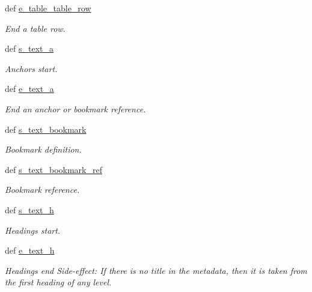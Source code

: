 \begin{DoxyCompactItemize}
def \hyperlink{classodf_1_1odf2xhtml_1_1ODF2XHTML_a2c0009aefeaa32a4aebf651241ec6457}{e\+\_\+table\+\_\+table\+\_\+row}
\begin{DoxyCompactList}\small\item\em End a table row. \end{DoxyCompactList}\item 
def \hyperlink{classodf_1_1odf2xhtml_1_1ODF2XHTML_a49f1c77f30fb4f13ba9fbd834c68c5fb}{s\+\_\+text\+\_\+a}
\begin{DoxyCompactList}\small\item\em Anchors start. \end{DoxyCompactList}\item 
def \hyperlink{classodf_1_1odf2xhtml_1_1ODF2XHTML_a14a820640a82139efd06c6f5380bb53b}{e\+\_\+text\+\_\+a}
\begin{DoxyCompactList}\small\item\em End an anchor or bookmark reference. \end{DoxyCompactList}\item 
def \hyperlink{classodf_1_1odf2xhtml_1_1ODF2XHTML_a81094645caa9e4af42180c1cbff16295}{s\+\_\+text\+\_\+bookmark}
\begin{DoxyCompactList}\small\item\em Bookmark definition. \end{DoxyCompactList}\item 
def \hyperlink{classodf_1_1odf2xhtml_1_1ODF2XHTML_a9d3a13f16064ec5f8ed95b7a5391a990}{s\+\_\+text\+\_\+bookmark\+\_\+ref}
\begin{DoxyCompactList}\small\item\em Bookmark reference. \end{DoxyCompactList}\item 
def \hyperlink{classodf_1_1odf2xhtml_1_1ODF2XHTML_ac5a2860e5b34c6ef9e92c6c4a3123810}{s\+\_\+text\+\_\+h}
\begin{DoxyCompactList}\small\item\em Headings start. \end{DoxyCompactList}\item 
def \hyperlink{classodf_1_1odf2xhtml_1_1ODF2XHTML_a594ecf8ef3da1464e5b6d37a7f3875fb}{e\+\_\+text\+\_\+h}
\begin{DoxyCompactList}\small\item\em Headings end Side-\/effect\+: If there is no title in the metadata, then it is taken from the first heading of any level. \end{DoxyCompactList}\item 

\end{DoxyCompactItemize}

